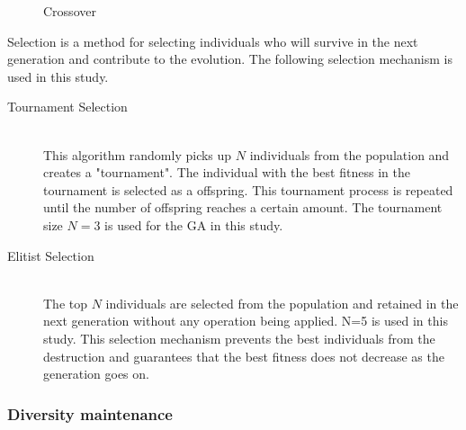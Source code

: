 \documentclass[12pt]{article} %
\begin{document}
\begin{figure}[H] %
\caption{Crossover}
\label{fig:crossover}
\end{figure}

Selection is a method for selecting individuals who will survive in the next generation and contribute to the evolution. The following selection mechanism is used in this study.

\begin{description} %
\item[Tournament Selection] \hfill \\
 This algorithm randomly picks up $N$ individuals from the population and creates a "tournament". The individual with the best fitness in the tournament is selected as a offspring. This tournament process is repeated until the number of offspring reaches a certain amount. The tournament size $N=3$ is used for the GA in this study.\\

\item [Elitist Selection] \hfill \\
The top $N$ individuals are selected from the population and retained in the next generation without any operation being applied. N=5 is used in this study. This selection mechanism prevents the best individuals from the destruction and guarantees that the best fitness does not decrease as the generation goes on.

\end{description} 

\subsubsection{Diversity maintenance}
\end{document}
